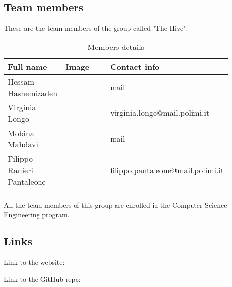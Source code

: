 \subsection{Team members}
These are the team members of the group called "The Hive":
\begin{longtable}
    {|m{0.2\linewidth}|m{0.2\linewidth}|m{0.5\linewidth}|}
            \hline
            \textbf{Full name} & \textbf{Image} & \textbf{Contact info}\\
            \hline
            \endhead
                Hessam Hashemizadeh &
                \centering
                & mail \\
            \hline
                Virginia Longo  &
                \centering
                & virginia.longo@mail.polimi.it \\
            \hline
                Mobina Mahdavi &
                \centering
                & mail \\
            \hline
                Filippo Ranieri Pantaleone &
                \centering
                & filippo.pantaleone@mail.polimi.it \\
            \hline
            \caption{Members details}
            \label{table:mem_details}
\end{longtable}

All the team members of this group are enrolled in the Computer Science Engineering program.

\subsection{Links}
Link to the website:

Link to the GitHub repo:

\newpage

